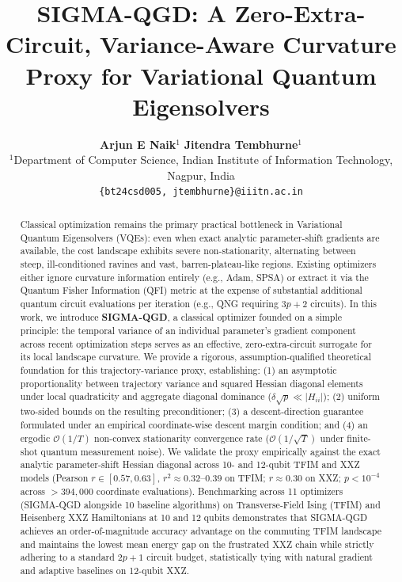 \documentclass[11pt,a4paper]{article}
\title{\textbf{SIGMA-QGD: A Zero-Extra-Circuit, Variance-Aware Curvature Proxy for Variational Quantum Eigensolvers}}
\author{
    \textbf{Arjun E Naik}$^{1}$ \quad \textbf{Jitendra Tembhurne}$^{1}$ \\[1ex]
    $^{1}$Department of Computer Science, Indian Institute of Information Technology, Nagpur, India \\
    \texttt{\{bt24csd005, jtembhurne\}@iiitn.ac.in}
}
\date{}
\begin{document}
\maketitle

\begin{abstract}
Classical optimization remains the primary practical bottleneck in Variational Quantum Eigensolvers (VQEs): even when exact analytic parameter-shift gradients are available, the cost landscape exhibits severe non-stationarity, alternating between steep, ill-conditioned ravines and vast, barren-plateau-like regions. Existing optimizers either ignore curvature information entirely (e.g., Adam, SPSA) or extract it via the Quantum Fisher Information (QFI) metric at the expense of substantial additional quantum circuit evaluations per iteration (e.g., QNG requiring $3p+2$ circuits). In this work, we introduce \textbf{SIGMA-QGD}, a classical optimizer founded on a simple principle: the temporal variance of an individual parameter's gradient component across recent optimization steps serves as an effective, zero-extra-circuit surrogate for its local landscape curvature. We provide a rigorous, assumption-qualified theoretical foundation for this trajectory-variance proxy, establishing: (1) an asymptotic proportionality between trajectory variance and squared Hessian diagonal elements under local quadraticity and aggregate diagonal dominance ($\delta \sqrt{p} \ll |H_{ii}|$); (2) uniform two-sided bounds on the resulting preconditioner; (3) a descent-direction guarantee formulated under an empirical coordinate-wise descent margin condition; and (4) an ergodic $\mathcal{O}(1/T)$ non-convex stationarity convergence rate ($\mathcal{O}(1/\sqrt{T})$ under finite-shot quantum measurement noise). We validate the proxy empirically against the exact analytic parameter-shift Hessian diagonal across 10- and 12-qubit TFIM and XXZ models (Pearson $r \in [0.57, 0.63]$, $r^2 \approx 0.32\text{--}0.39$ on TFIM; $r \approx 0.30$ on XXZ; $p < 10^{-4}$ across $>394{,}000$ coordinate evaluations). Benchmarking across 11 optimizers (SIGMA-QGD alongside 10 baseline algorithms) on Transverse-Field Ising (TFIM) and Heisenberg XXZ Hamiltonians at 10 and 12 qubits demonstrates that SIGMA-QGD achieves an order-of-magnitude accuracy advantage on the commuting TFIM landscape and maintains the lowest mean energy gap on the frustrated XXZ chain while strictly adhering to a standard $2p+1$ circuit budget, statistically tying with natural gradient and adaptive baselines on 12-qubit XXZ.
\end{abstract}
\end{document}
